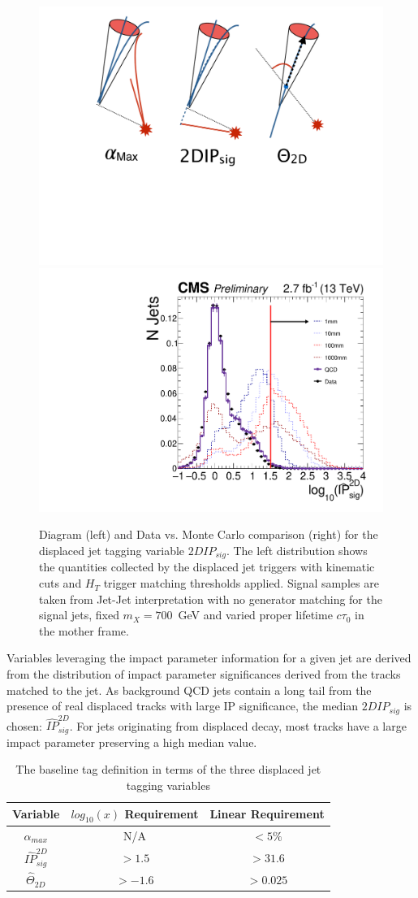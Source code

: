 \begin{figure}
\begin{center}
\includegraphics[width=.2\textwidth]{figures/pas/DIAGRAMS/ip_diag.pdf}
\includegraphics[width=.5\textwidth]{figures/pas/SELECTION/76x_pu/DJET_ipsig2d.pdf}
\caption{Diagram (left) and Data vs. Monte Carlo comparison (right) for the displaced jet tagging variable $2DIP_{sig}$. 
The left distribution  shows the quantities collected by the displaced jet triggers with kinematic cuts and $H_T$ trigger
 matching thresholds applied. Signal samples are taken from Jet-Jet interpretation with no generator matching for the signal
 jets, fixed $m_X=700$~GeV and varied proper lifetime $c\tau_0$ in the mother frame. 
 \label{fig:2dipsig}}
\end{center}
\end{figure}

Variables leveraging the impact parameter information for a given jet are derived from the distribution of impact parameter significances derived
from the tracks matched to the jet. As background QCD jets contain a long tail from the presence of real displaced tracks with large IP significance,
the median $2DIP_{sig}$ is chosen: $\hat{IP}^{2D}_{sig}$. For jets originating from displaced decay, most tracks have a large impact parameter 
preserving a high median value. 

\begin{table}
\begin{center}
\caption{The baseline tag definition in terms of the three displaced jet tagging variables \label{tab:tag_def}}
\begin{tabular}{ccc}
\textbf{Variable} & \textbf{$log_{10}(x)$ Requirement} & \textbf{Linear Requirement}\\
\hline 
$\alpha_{max}$  & N/A &  $<5\%$ \\
$\hat{IP}^{2D}_{sig}$  &  $>1.5$ & $>31.6$ \\
$\hat{\Theta}_{2D}$  &  $>-1.6$ & $>0.025$
\end{tabular}
\end{center}
\end{table}

